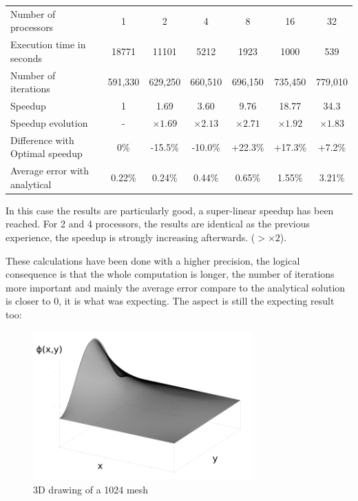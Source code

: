 \documentclass[a4paper,11pt]{article}
\begin{document}
\vspace{2em}
\hspace{-5em}
\begin{tabular}{l | c | c | c | c | c | c}
Number of processors & 1 & 2 & 4 & 8 & 16 & 32 \\
Execution time in seconds & 18771 & 11101 & 5212 & 1923 & 1000 & 539 \\
Number of iterations & 591,330 & 629,250 & 660,510 & 696,150 & 735,450 & 779,010 \\
Speedup & 1 & 1.69 & 3.60 & 9.76 & 18.77 & 34.3 \\
Speedup evolution & - & $\times1.69$ & $\times2.13$ & $\times2.71$ & $\times1.92$  & $\times1.83$ \\
Difference with Optimal speedup & 0\% & -15.5\% & -10.0\% & +22.3\% & +17.3\% & +7.2\% \\
Average error with analytical & 0.22\% & 0.24\% & 0.44\% & 0.65\% & 1.55\% & 3.21\%
\end{tabular}
\vspace{1em}

In this case the results are particularly good, a super-linear speedup has been reached. For 2 and 4 processors,
the results are identical as the previous experience, the speedup is strongly increasing afterwards. ($> \times2$).

\vspace{1em}
These calculations have been done with a higher precision, the logical consequence is that the whole computation
is longer, the number of iterations more important and mainly the average error compare to the analytical solution
is closer to 0, it is what was expecting. The aspect is still the expecting result too:

\begin{figure}
\centering
\includegraphics[width=0.75\textwidth]{1024_mesh.png}
\caption{3D drawing of a 1024 mesh}
\end{figure}
\end{document}
